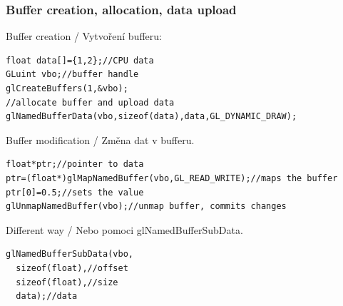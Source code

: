 
\begin{frame}[fragile]
\frametitle{Buffer creation, allocation, data upload}
Buffer creation / Vytvoření bufferu:
\scriptsize
\begin{verbatim}
float data[]={1,2};//CPU data
GLuint vbo;//buffer handle
glCreateBuffers(1,&vbo);
//allocate buffer and upload data
glNamedBufferData(vbo,sizeof(data),data,GL_DYNAMIC_DRAW);
\end{verbatim}
Buffer modification / Změna dat v bufferu.
\scriptsize
\begin{verbatim}
float*ptr;//pointer to data
ptr=(float*)glMapNamedBuffer(vbo,GL_READ_WRITE);//maps the buffer
ptr[0]=0.5;//sets the value
glUnmapNamedBuffer(vbo);//unmap buffer, commits changes
\end{verbatim}
Different way / Nebo pomoci {\color{blue} glNamedBufferSubData}.
    {\scriptsize
\begin{verbatim}
glNamedBufferSubData(vbo,
  sizeof(float),//offset
  sizeof(float),//size
  data);//data
    \end{verbatim}
    }
\end{frame}


